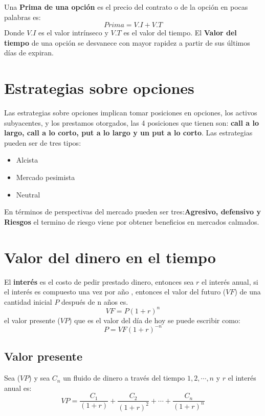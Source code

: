 \begin{defn}Una \textbf{ Prima de una opción} es el precio del contrato o de la opción en pocas palabras es: 
	\begin{equation}\label{eq1}
	Prima= V.I +V.T
	\end{equation}
	Donde $ V.I $ es el valor intrínseco y $ V.T $ es el valor del tiempo.
\newline
El \textbf{Valor del tiempo} de una opción se desvanece con mayor rapidez a partir de sus últimos días de expiran.
\section{Estrategias sobre opciones}
Las estrategias sobre opciones implican tomar posiciones en opciones, los activos subyacentes, y los prestamos otorgados, las 4 posiciones que tienen son: \textbf{call a lo largo, call a lo corto, put a lo largo y un put a lo corto}. Las estrategias pueden ser de tres tipos:
		\begin{itemize}
			\item Alcista
			\item Mercado pesimista 
			\item Neutral
			
		\end{itemize}
En términos de perspectivas del mercado pueden ser tres:\textbf{Agresivo, defensivo y Riesgos } el termino de riesgo viene por obtener beneficios en mercados calmados.		
	
			\section{Valor del dinero en el tiempo}
			El \textbf{interés} es el costo de pedir prestado dinero, entonces sea $ r $ el interés anual, si el interés es compuesto una vez por año , entonces el valor del futuro ($ VF $)	de una cantidad inicial  $ P $ después de n años es.
			\begin{equation}\label{eq0}
		    VF=P(1+r)^{n}
			\end{equation}
			el valor presente ($ VP $) que es el valor del día de hoy se puede escribir como:		
							\begin{equation}\label{eq0}
							P=VF(1+r)^{-n}
							\end{equation}
				\subsection	{Valor presente}
				Sea ($ VP $) y sea $ C_{n} $ un fluido de dinero a través del tiempo $ 1,2,\cdots,n $ y $ r $ el interés anual es:
						\begin{equation}\label{eq0}
						VP= \dfrac{C_{1}}{(1+r)}+\dfrac{C_{2}}{(1+r)^{2}}+\cdots+\dfrac{C_{n}}{(1+r)^{n}}
						\end{equation}	

\end{defn}
